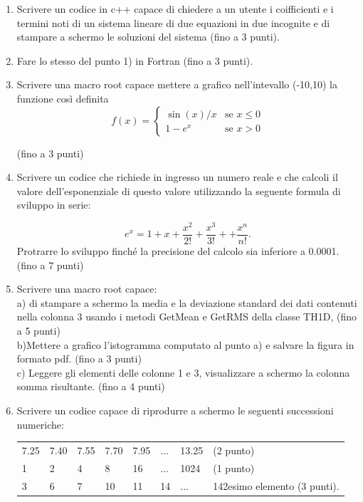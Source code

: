 \documentclass[11pt,fleqn]{book} %
\begin{document}
\begin{enumerate}


\item Scrivere un codice in c++ capace di  chiedere a un utente i coifficienti e i termini noti di un sistema lineare di due equazioni in due incognite e di stampare a schermo le soluzioni del sistema (fino a 3 punti).

\item Fare lo stesso del punto 1) in Fortran (fino a 3 punti).


\item Scrivere una macro root capace mettere a grafico nell'intevallo (-10,10)
la funzione così definita 
$$
f(x) =
\left\{
\begin{array}{rl}
\sin(x) / x & \mbox{se } x \leq 0 \\
1-e^{x} & \mbox{se } x > 0
\end{array}
\right.
$$

 (fino a 3  punti)

\item Scrivere un codice che richiede in ingresso un numero reale e che calcoli il valore dell'esponenziale di questo valore utilizzando la seguente formula di sviluppo in serie:\vspace{-0.5 cm}

$$ e^x =  1 + x + \frac{x^2}{2!} + \frac{x^3}{3!} + + \frac{x^n}{n!}.
$$
Protrarre lo sviluppo finché la precisione del calcolo sia inferiore a 0.0001. (fino a 7 punti)  

\item Scrivere una macro root capace:\\
     a) di stampare a schermo la media e la deviazione standard dei dati contenuti nella  colonna 3 usando i metodi GetMean e GetRMS della classe TH1D, (fino a 5 punti) \\
     b)Mettere a grafico l'istogramma computato al punto a) e salvare la figura in formato pdf.   (fino a 3 punti)\\
     c) Leggere gli elementi delle colonne 1 e 3, visualizzare a schermo la colonna somma risultante. (fino a 4 punti)



\item  Scrivere un codice capace di riprodurre a schermo le seguenti successioni numeriche:\\
\begin{tabular}{llllllll}
7.25 & 7.40 & 7.55 & 7.70 & 7.95 & ... &   13.25 & (2 punto)\\
1 & 2 & 4 & 8 & 16 & ... & 1024 &   (1 punto)\\
3 & 6 & 7 & 10 & 11 & 14 & ... & 142esimo elemento (3 punti).
\end{tabular}

\end{enumerate}
\end{document}
